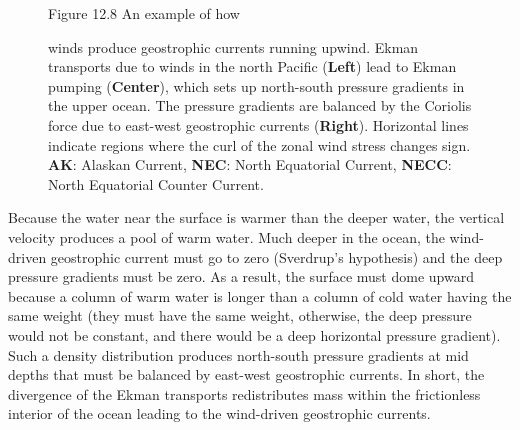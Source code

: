 \begin{figure}[b!]
\vspace{-3ex}
\footnotesize
Figure 12.8 An example of how \rule{0pt}{5ex}winds produce geostrophic
currents running upwind. Ekman transports due
to winds in the north Pacific (\textbf{Left}) lead to Ekman
pumping (\textbf{Center}), which sets up
north-south pressure gradients in the upper ocean. The pressure
gradients are balanced by the Coriolis force due to east-west
geostrophic currents
(\textbf{Right}). Horizontal lines indicate regions where the curl of
the zonal wind stress changes
sign. \textbf{AK}: Alaskan Current, \textbf{NEC}: North Equatorial
Current, \textbf{NECC}: North Equatorial Counter Current.
\label{fig:zonalmeanwinds}
\vfill
\end{figure}

Because the water near the surface is warmer than the deeper water,
the vertical velocity produces a pool of warm water. Much deeper in
the ocean, the wind-driven geostrophic current must go to zero
(Sverdrup's hypothesis) and the deep pressure gradients must be
zero. As a result, the surface must dome upward because a column of
warm water is longer than a column of cold water having the same
weight (they must have the same weight, otherwise, the deep pressure
would not be constant, and there would be a deep horizontal pressure
gradient). Such a density distribution produces north-south pressure
gradients at mid depths that must be balanced by east-west geostrophic
currents. In short, the divergence of the Ekman
transports redistributes mass within the
frictionless interior of the ocean leading to the wind-driven
geostrophic currents.

